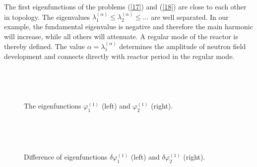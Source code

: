 \documentclass[authoryear]{elsarticle}
\begin{document}
The first eigenfunctions of the problems (\ref{17}) and (\ref{18}) are close to each other in topology.
The eigenvalues $\lambda_1^{(\alpha)} \leq  \lambda_2^{(\alpha)} \leq ...$
are well separated. In our example, the fundamental eigenvalue is negative and therefore the main harmonic will increase, while all others will attenuate. A regular mode of the reactor is thereby defined. The value $\alpha = \lambda_1^{(\alpha)}$ determines the amplitude of neutron field development and connects directly with reactor period in the regular mode.

\begin{figure}[htp]
  \begin{center}
\begin{minipage}{0.49\linewidth}
 \\
\end{minipage}
\hfill
\begin{minipage}{0.49\linewidth}
 \\
\end{minipage}
\caption{The eigenfunctions $\varphi^{(1)}_1$ (left) and $\varphi^{(1)}_2$ (right).}
\label{fig:7}
  \end{center}
\end{figure}

\begin{figure}[htp]
  \begin{center}
\begin{minipage}{0.49\linewidth}
 \\
\end{minipage}
\hfill
\begin{minipage}{0.49\linewidth}
 \\
\end{minipage}
\caption{Difference of eigenfunctions $\delta \varphi^{(1)}_1$ (left) and $\delta \varphi^{(1)}_2$ (right).}
\label{fig:7a}
  \end{center}
\end{figure}
\end{document}
